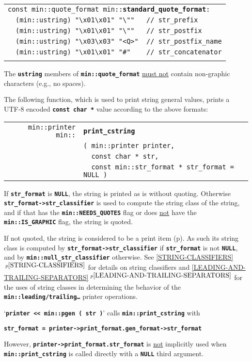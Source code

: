 \documentclass[12pt]{article}
\makeatletter
\newcommand{\TT}[1]{{\tt \bfseries #1}}
\newcommand{\ttindex}[1]{\index{#1@{\tt #1}}}
\newcommand{\itemref}[1]{\ref{#1}$\,^{p\pageref{#1}}$}
\newcommand{\pagref}[1]{p\pageref{#1}}
\newcommand{\EOL}{\penalty \exhyphenpenalty}
\newenvironment{indpar}[1][0.3in]%
	{\begin{list}{}%
		     {\setlength{\itemsep}{0in}%
		      \setlength{\topsep}{0in}%
		      \setlength{\parsep}{1ex}%
		      \setlength{\labelwidth}{#1}%
		      \setlength{\leftmargin}{#1}%
		      \addtolength{\leftmargin}{\labelsep}}%
	 \item}%
	{\end{list}}
\newcommand{\LABEL}[1]{\label{#1}}
\newlength{\ARGBREAKLENGTH}
\newcommand{\ARGBREAK}[1][\ARGBREAKLENGTH]{\\&\hspace*{#1}}
\newcommand{\MINKEY}[1]%
	   {\TT{#1}\ttindex{min::#1}\ttindex{#1}}
\makeatother
\begin{document}
\begin{indpar}[1em]\begin{tabular}{r@{}l}
\multicolumn{2}{l}{\tt const min::quote\_format
                   min::\MINKEY{standard\_quote\_format}:}\ARGBREAK
\verb|(min::ustring) "\x01\x01" "\""   // str_prefix|\ARGBREAK
\verb|(min::ustring) "\x01\x01" "\""   // str_postfix|\ARGBREAK
\verb|(min::ustring) "\x03\x03" "<Q>"  // str_postfix_name|\ARGBREAK
\verb|(min::ustring) "\x01\x01" "#"    // str_concatenator|\ARGBREAK
\LABEL{MIN::STANDARD_QUOTE_FORMAT}
\end{tabular}\end{indpar}

The \TT{ustring} members of \TT{min::quote\_format} \underline{must not}
contain non-graphic characters (e.g., no spaces).

The following function, which is used to print string general values,
prints a UTF-8 encoded \TT{const char *}
value according to the above formats:

\begin{indpar}[1em]\begin{tabular}{r@{}l}
\verb|min::printer min::| & \MINKEY{print\_cstring}\ARGBREAK
    \verb|( min::printer printer,|\ARGBREAK
    \verb|  const char * str,|\ARGBREAK
    \verb|  const min::str_format * str_format = NULL )|
\LABEL{MIN::PRINT_CSTRING} \\
\end{tabular}\end{indpar}

If \TT{str\_\EOL format} is \TT{NULL},
the string is printed as is without quoting.
Otherwise \TT{str\_\EOL format->\EOL str\_\EOL classifier}
is used to compute the
string class of the string, and if that has the
\TT{min::\EOL NEEDS\_\EOL QUOTES} flag or does \underline{not} have the
\TT{min::\EOL IS\_\EOL GRAPHIC} flag, the string is quoted.

If not quoted, the string
is considered to be a print item (\pagref{PRINT-ITEM}).
As such its string class is computed by
\TT{str\_\EOL format->\EOL str\_\EOL classifier} if \TT{str\_\EOL format}
is not \TT{NULL}, and by \TT{min::\EOL null\_\EOL str\_\EOL classifier}
otherwise.
See \itemref{STRING-CLASSIFIERS} for details on string classifiers
and \itemref{LEADING-AND-TRAILING-SEPARATORS} for the uses of string
classes in determining the behavior of the
\TT{min::\EOL leading/\EOL trailing\ldots} printer operations.

`\TT{printer <{}< min::pgen ( str )}' calls \TT{min::\EOL print\_\EOL cstring}
with
\begin{center}
\TT{str\_format = printer->print\_format.gen\_format->str\_format}
\end{center}
However,
\TT{printer->\EOL print\_\EOL format.str\_\EOL format} is \underline{not}
implicitly used when \TT{min::\EOL print\_\EOL cstring} is called directly
with a \TT{NULL} third argument.
\end{document}
